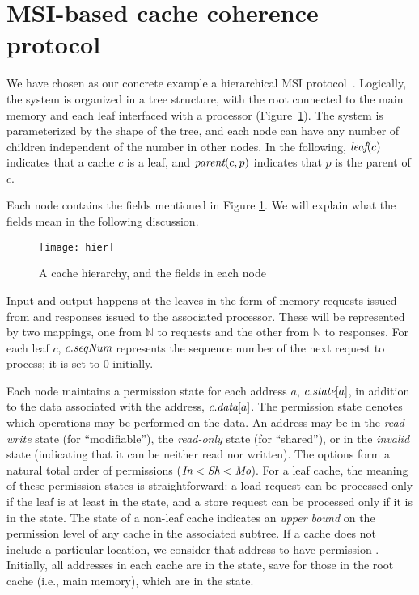 \section{MSI-based cache coherence protocol}
\label{sec:System}

We have chosen as our concrete example a hierarchical MSI
protocol~\cite{MSI}. Logically, the system is organized in a tree
structure, with the root connected to the main memory and each leaf interfaced
with a processor (Figure~\ref{hier}). The system is parameterized by the shape
of the tree, and each node can have any number of children independent of the
number in other nodes. In the following, $\textit{leaf}(c)$ indicates
that a cache $c$ is a leaf, and $\textit{parent}(c,p)$ indicates that $p$ is the parent of
$c$.

Each node contains the fields mentioned in Figure \ref{hier}. We will
explain what the fields mean in the following discussion.

\begin{figure}
\centering
\texttt{[image: hier]}
\caption{A cache hierarchy, and the fields in each node}
\label{hier}
\end{figure}

Input and output happens at the leaves in the form of memory requests
issued from and responses issued to the associated processor. These will be
represented by two mappings, one from $\mathbb{N}$ to requests and the other
from $\mathbb{N}$ to responses. For each leaf $c$, $c.\textit{seqNum}$ represents the
sequence number of the next request to process; it is set to $0$ initially.

Each node maintains a permission state for each address $a$, $c.\textit{state}[a]$, in
addition to the data associated with the address, $c.\textit{data}[a]$. The permission
state denotes which operations may be performed on the data. An address may be
in the \emph{read-write} state \Mo{} (for ``modifiable''),
the \emph{read-only} state \Sh{} (for ``shared''), or in the \emph{invalid} state
\In{} (indicating that it can be neither read nor written). The options form a natural
total order of permissions ($\textit{In} < \textit{Sh} < \textit{Mo}$). For a leaf cache, the meaning
of these permission states is straightforward: a load request can be processed
only if the leaf is at least in the \Sh{} state, and a store request can be
processed only if it is in the \Mo{} state. The state of a non-leaf cache indicates
an \emph{upper bound} on the permission level of any cache in the associated subtree.
If a cache does not include a particular location,
we consider that address to have permission \In.  Initially, all addresses in
each cache are in the \In{} state, save for those in the root cache (i.e., main memory),
which are in the \Mo{} state.

